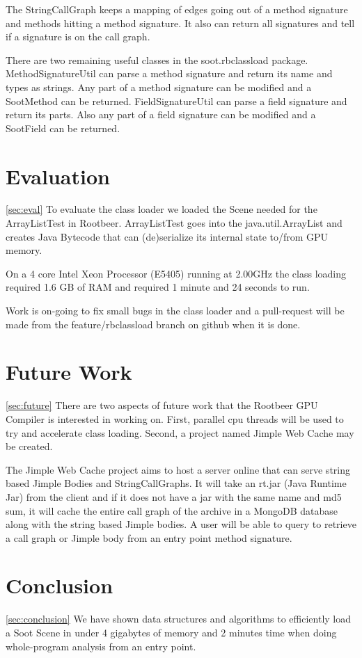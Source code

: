 \documentclass[preprint]{sigplanconf}
\begin{document}
The StringCallGraph keeps a mapping of edges going out of a method signature and methods hitting a method signature. It also can return all signatures and tell if a signature is on the call graph.

There are two remaining useful classes in the soot.rbclassload package. MethodSignatureUtil can parse a method signature and return its name and types as strings. Any part of a method signature can be modified and a SootMethod can be returned. FieldSignatureUtil can parse a field signature and return its parts. Also any part of a field signature can be modified and a SootField can be returned.

\section{Evaluation}
\ref{sec:eval}
To evaluate the class loader we loaded the Scene needed for the ArrayListTest in Rootbeer. ArrayListTest goes into the java.util.ArrayList and creates Java Bytecode that can (de)serialize its internal state to/from GPU memory.

On a 4 core Intel Xeon Processor (E5405) running at 2.00GHz the class loading required 1.6 GB of RAM and required 1 minute and 24 seconds to run. 

Work is on-going to fix small bugs in the class loader and a pull-request will be made from the feature/rbclassload branch on github when it is done.

\section{Future Work}
\ref{sec:future}
There are two aspects of future work that the Rootbeer GPU Compiler is interested in working on. First, parallel cpu threads will be used to try and accelerate class loading. Second, a project named Jimple Web Cache may be created.

The Jimple Web Cache project aims to host a server online that can serve string based Jimple Bodies and StringCallGraphs. It will take an rt.jar (Java Runtime Jar) from the client and if it does not have a jar with the same name and md5 sum, it will cache the entire call graph of the archive in a MongoDB database along with the string based Jimple bodies. A user will be able to query to retrieve a call graph or Jimple body from an entry point method signature.

\section{Conclusion}
\ref{sec:conclusion}
We have shown data structures and algorithms to efficiently load a Soot Scene in under 4 gigabytes of memory and 2 minutes time when doing whole-program analysis from an entry point.
\end{document}
